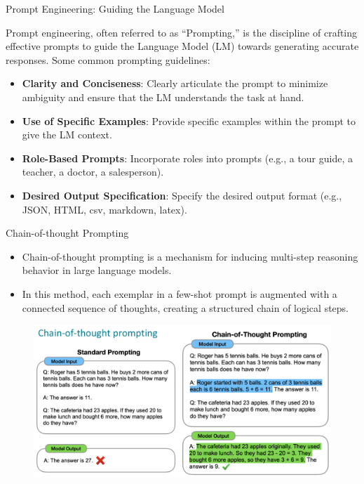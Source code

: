 \documentclass[handout]{beamer}
\begin{document}
\begin{frame}{Prompt Engineering: Guiding the Language Model}
\begin{scriptsize}
Prompt engineering, often referred to as ``Prompting,'' is the discipline of crafting effective prompts to guide the Language Model (LM) towards generating accurate responses. Some common prompting guidelines: \vspace{0.5cm}

\begin{itemize}
\item \textbf{Clarity and Conciseness}: Clearly articulate the prompt to minimize ambiguity and ensure that the LM understands the task at hand.
\item \textbf{Use of Specific Examples}: Provide specific examples within the prompt to give the LM context.
\item \textbf{Role-Based Prompts}: Incorporate roles into prompts (e.g., a tour guide, a teacher, a doctor, a salesperson).
\item \textbf{Desired Output Specification}: Specify the desired output format (e.g., JSON, HTML, csv, markdown, latex).
\end{itemize}
\end{scriptsize}
\end{frame}


\begin{frame}{Chain-of-thought Prompting}

\begin{scriptsize}
\begin{itemize}
\item Chain-of-thought prompting is a mechanism for inducing multi-step reasoning behavior in large language models.
\item In this method, each exemplar in a few-shot prompt is augmented with a connected sequence of thoughts, creating a structured chain of logical steps. \cite{wei2022chain}
\end{itemize}
\end{scriptsize}



 \begin{figure}[h]
        	\includegraphics[scale = 0.3]{pics/chainoftought.png}
        \end{figure}



\end{frame}
\end{document}
